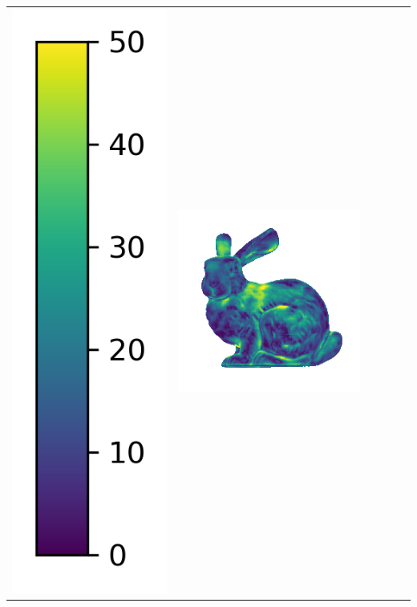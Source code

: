 \begin{center}
\begin{tabularx}{\linewidth}{@{}Y@{}Y@{}Y@{}Y@{}Y@{}Y@{}}
\includegraphics[width=0.2\linewidth]{semisynthetic/colorbar_error_vertical.png} &
\includegraphics[width=\linewidth]{semisynthetic/20150514_14_ours_err.png} &

\end{tabularx}
\end{center}
